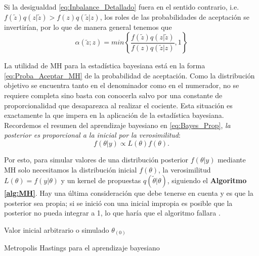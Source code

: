 Si la desigualdad \eqref{eq:Inbalance_Detallado} fuera en el sentido contrario, i.e. $f(\tilde{z})q(z|\tilde{z})>f(z)q(\tilde{z}|z)$, los roles de las probabilidades de aceptación se invertirían, por lo que de manera general tenemos que 
\begin{equation}
\label{eq:Proba_Aceptar_MH}
\alpha(\tilde{z};z)=min\left\lbrace\dfrac{f(\tilde{z})q(z|\tilde{z})}{f(z)q(\tilde{z}|z)},1\right\rbrace
\end{equation}

La utilidad de MH para la estadística bayesiana está en la forma \eqref{eq:Proba_Aceptar_MH} de la probabilidad de aceptación. Como la distribución objetivo se encuentra tanto en el denominador como en el numerador, no se requiere completa sino basta con conocerla salvo por una constante de proporcionalidad que desaparezca al realizar el cociente. Esta situación es exactamente la que impera en la aplicación de la estadística bayesiana. Recordemos el resumen del aprendizaje bayesiano en \eqref{eq:Bayes_Prop}, \textit{la posterior es proporcional a la inicial por la verosimilitud}: 
\begin{equation*}
f(\theta|y) \propto L(\theta)f(\theta).
\end{equation*}

Por esto, para simular valores de una distribución posterior $f(\theta|y)$ mediante MH solo necesitamos la distribución inicial $f(\theta)$, la verosimilitud $L(\theta)=f(y|\theta)$ y un kernel de propuestas $q(\tilde{\theta}|\theta)$, siguiendo el \textbf{Algoritmo \ref{alg:MH}}. Hay una última consideración que debe tenerse en cuenta y es que la posterior sea propia; si se inició con una inicial impropia es posible que la posterior no pueda integrar a 1, lo que haría que el algoritmo fallara \parencite{RobertCasella10}.\\

\begin{algorithm}
\DontPrintSemicolon
Valor inicial arbitrario o simulado $\theta_{(0)}$\;

\caption{Metropolis Hastings para el aprendizaje bayesiano \label{alg:MH}}
\end{algorithm}

